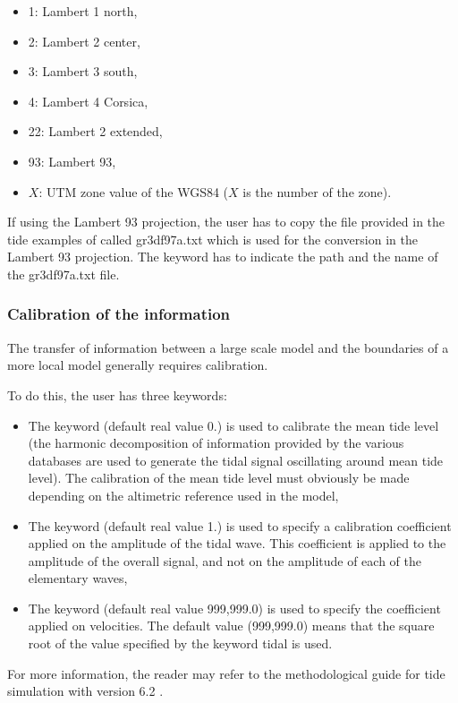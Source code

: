 \begin{itemize}
\item 1: Lambert 1 north,

\item 2: Lambert 2 center,

\item 3: Lambert 3 south,

\item 4: Lambert 4 Corsica,

\item 22: Lambert 2 extended,

\item 93: Lambert 93,

\item $X$: UTM zone value of the WGS84 ($X$ is the number of the
zone).
\end{itemize}

If using the Lambert 93 projection, the user has to copy the file provided
in the tide examples of  called gr3df97a.txt which is used
for the conversion in the Lambert 93 projection.
The keyword  has to indicate the path
and the name of the gr3df97a.txt file.

\subsubsection{Calibration of the information}

The transfer of information between a large scale model and the boundaries of
a more local model generally requires calibration.

To do this, the user has three keywords:

\begin{itemize}
\item The keyword  (default real
value 0.) is used to calibrate the mean tide level (the harmonic decomposition
of information provided by the various databases are used to generate the tidal
signal oscillating around mean tide level). The calibration of the mean tide
level must obviously be made depending on the altimetric reference used in the
model,

\item The keyword  (default real
value 1.) is used to specify a calibration coefficient applied on the
amplitude of the tidal wave. This coefficient is applied to the amplitude of
the overall signal, and not on the amplitude of each of the elementary waves,

\item The keyword  (default
real value 999,999.0) is used to specify the coefficient applied on velocities.
The default value (999,999.0) means that the square root of the value
specified by the keyword  tidal is
used.
\end{itemize}

For more information, the reader may refer to the methodological guide for tide
simulation with version 6.2 \cite{Pham2012}.
